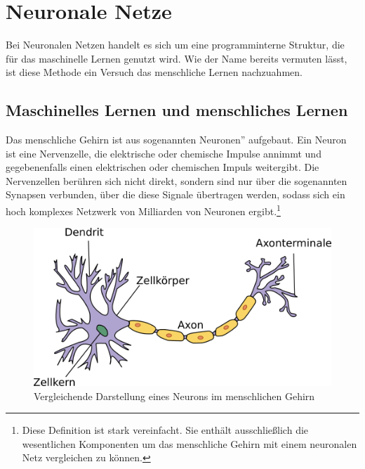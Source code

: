 \documentclass[11pt]{article}
\begin{document}
\section{Neuronale Netze}\label{sec:neuronale-netze}
Bei Neuronalen Netzen handelt es sich um eine programminterne Struktur, die für das maschinelle Lernen genutzt wird. Wie der Name bereits vermuten lässt, ist diese Methode ein Versuch das menschliche Lernen nachzuahmen.
\subsection{Maschinelles Lernen und menschliches Lernen}
Das menschliche Gehirn ist aus sogenannten \glqq Neuronen'' aufgebaut. Ein Neuron ist eine Nervenzelle, die elektrische oder chemische Impulse annimmt und gegebenenfalls einen elektrischen oder chemischen Impuls weitergibt. Die Nervenzellen berühren sich nicht direkt, sondern sind nur über die sogenannten Synapsen verbunden, über die diese Signale übertragen werden, sodass sich ein hoch komplexes Netzwerk von Milliarden von Neuronen ergibt.\footnote{
Diese Definition ist stark vereinfacht. Sie enthält ausschließlich die wesentlichen Komponenten um das menschliche Gehirn mit einem neuronalen Netz vergleichen zu können.}
\begin{figure}[h]
	\centering
	\includegraphics[]{../graphics/Neuron.png}
	\caption[Neuron \newline 
	Quelle: simple.wikipedia.org/wiki/File:Neuron.svg\newline
	Copyright: CC Attribution-Share Alike von Nutzer Dhp1080,\newline
 	bearbeitet]{Vergleichende Darstellung eines Neurons im menschlichen Gehirn}
\end{figure}
\end{document}
